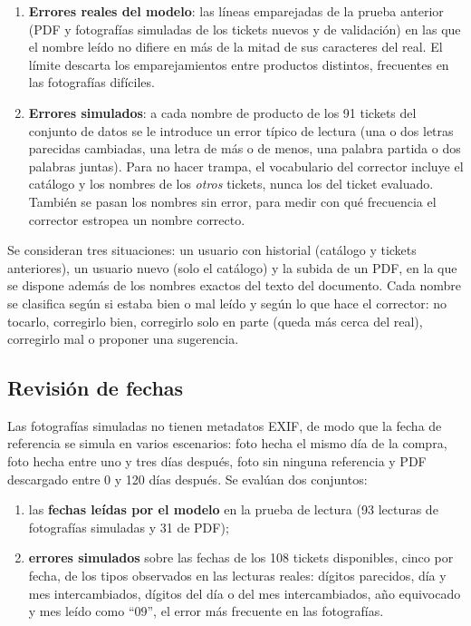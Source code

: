 \begin{enumerate}
    \item \textbf{Errores reales del modelo}: las líneas emparejadas de la prueba anterior (PDF y fotografías simuladas de los tickets nuevos y de validación) en las que el nombre leído no difiere en más de la mitad de sus caracteres del real. El límite descarta los emparejamientos entre productos distintos, frecuentes en las fotografías difíciles.
    \item \textbf{Errores simulados}: a cada nombre de producto de los 91 tickets del conjunto de datos se le introduce un error típico de lectura (una o dos letras parecidas cambiadas, una letra de más o de menos, una palabra partida o dos palabras juntas). Para no hacer trampa, el vocabulario del corrector incluye el catálogo y los nombres de los \emph{otros} tickets, nunca los del ticket evaluado. También se pasan los nombres sin error, para medir con qué frecuencia el corrector estropea un nombre correcto.
\end{enumerate}

Se consideran tres situaciones: un usuario con historial (catálogo y tickets anteriores), un usuario nuevo (solo el catálogo) y la subida de un PDF, en la que se dispone además de los nombres exactos del texto del documento. Cada nombre se clasifica según si estaba bien o mal leído y según lo que hace el corrector: no tocarlo, corregirlo bien, corregirlo solo en parte (queda más cerca del real), corregirlo mal o proponer una sugerencia.

\subsection{Revisión de fechas}
Las fotografías simuladas no tienen metadatos EXIF, de modo que la fecha de referencia se simula en varios escenarios: foto hecha el mismo día de la compra, foto hecha entre uno y tres días después, foto sin ninguna referencia y PDF descargado entre 0 y 120 días después. Se evalúan dos conjuntos:

\begin{enumerate}
    \item las \textbf{fechas leídas por el modelo} en la prueba de lectura (93 lecturas de fotografías simuladas y 31 de PDF);
    \item \textbf{errores simulados} sobre las fechas de los 108 tickets disponibles, cinco por fecha, de los tipos observados en las lecturas reales: dígitos parecidos, día y mes intercambiados, dígitos del día o del mes intercambiados, año equivocado y mes leído como \enquote{09}, el error más frecuente en las fotografías.
\end{enumerate}


